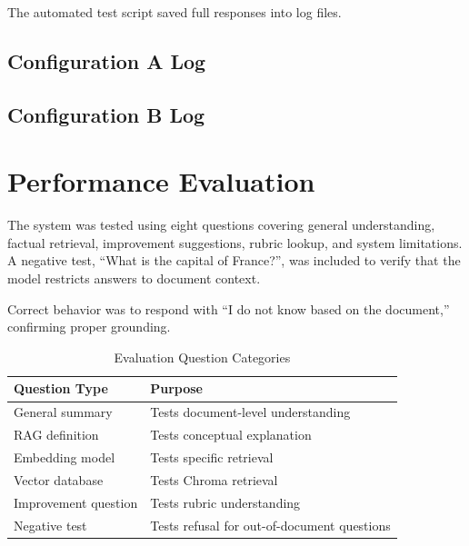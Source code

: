 \documentclass[11pt]{article}
\begin{document}
	The automated test script saved full responses into log files.
	
	\subsection{Configuration A Log}
	
	
	
	\subsection{Configuration B Log}
	
	
	
	\section{Performance Evaluation}
	
	The system was tested using eight questions covering general understanding, factual retrieval, improvement suggestions, rubric lookup, and system limitations. A negative test, ``What is the capital of France?'', was included to verify that the model restricts answers to document context.
	
	Correct behavior was to respond with ``I do not know based on the document,'' confirming proper grounding.
	
	\begin{table}[H]
		\centering
		\caption{Evaluation Question Categories}
		\begin{tabular}{ll}
			\toprule
			\textbf{Question Type} & \textbf{Purpose} \\
			\midrule
			General summary & Tests document-level understanding \\
			RAG definition & Tests conceptual explanation \\
			Embedding model & Tests specific retrieval \\
			Vector database & Tests Chroma retrieval \\
			Improvement question & Tests rubric understanding \\
			Negative test & Tests refusal for out-of-document questions \\
			\bottomrule
		\end{tabular}
	\end{table}
	
\end{document}

